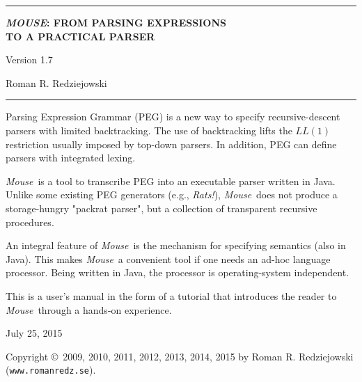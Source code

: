 \documentclass[a4paper,fleqn]{article}
\newcommand{\Version}{1.7}
\newcommand{\Mouse}{\textsl{Mouse}}
\newcommand{\tx}[1]{\texttt{#1}}
\begin{document}
\selectfont

\pagestyle{empty}
\begin{center}
\rule{\linewidth-20mm}{.5mm}

\bigskip
\Large \textbf{\textit{MOUSE}: FROM PARSING EXPRESSIONS\\TO A PRACTICAL PARSER}

\bigskip
\Large Version \Version

\bigskip
\Large Roman R. Redziejowski
\rule{\linewidth-20mm}{.5mm}




\normalsize
\parbox{0.875\linewidth}{
\noindent
Parsing Expression Grammar (PEG) is a new way to specify
recursive-descent parsers with limited backtracking.
The use of backtracking lifts the $LL(1)$ restriction usually imposed
by top-down parsers.
In addition, PEG can define parsers with integrated lexing.

\medskip
\noindent
\Mouse\ is a tool to transcribe PEG into an executable parser written in Java.
Unlike some existing PEG generators (e.g., \textsl{Rats!}), \Mouse\
does not produce a storage-hungry "packrat parser",
but a collection of transparent recursive procedures.

\medskip
\noindent
An integral feature of \Mouse\ is the mechanism for specifying
semantics (also in Java).
This makes \Mouse\ a convenient tool if one needs an ad-hoc language processor.
Being written in Java, the processor is operating-system independent.

\medskip
\noindent
This is a user's manual in the form of a tutorial
that introduces the reader to \Mouse\ through 
a hands-on experience.}
\end{center}

\begin{center}
July 25, 2015

\end{center}
\newpage


\noindent
Copyright \copyright\ 2009, 2010, 2011, 2012, 2013, 2014, 2015 by Roman R. Redziejowski (\tx{www.romanredz.se}).
\end{document}
